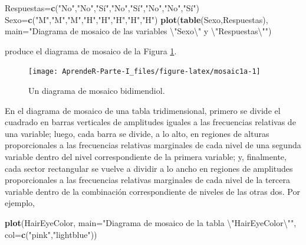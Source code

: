 \documentclass[]{book}
\newenvironment{Shaded}{\begin{snugshade}}{\end{snugshade}}
\newcommand{\CharTok}[1]{\textcolor[rgb]{0.31,0.60,0.02}{#1}}
\newcommand{\DataTypeTok}[1]{\textcolor[rgb]{0.13,0.29,0.53}{#1}}
\newcommand{\KeywordTok}[1]{\textcolor[rgb]{0.13,0.29,0.53}{\textbf{#1}}}
\newcommand{\NormalTok}[1]{#1}
\newcommand{\StringTok}[1]{\textcolor[rgb]{0.31,0.60,0.02}{#1}}
\theoremstyle{definition}
\theoremstyle{definition}
\theoremstyle{definition}
\theoremstyle{remark}
\begin{document}
\begin{Shaded}
\begin{Highlighting}[]
\NormalTok{Respuestas=}\KeywordTok{c}\NormalTok{(}\StringTok{"No"}\NormalTok{,}\StringTok{"No"}\NormalTok{,}\StringTok{"Sí"}\NormalTok{,}\StringTok{"No"}\NormalTok{,}\StringTok{"Sí"}\NormalTok{,}\StringTok{"No"}\NormalTok{,}\StringTok{"No"}\NormalTok{,}\StringTok{"Sí"}\NormalTok{)}
\NormalTok{Sexo=}\KeywordTok{c}\NormalTok{(}\StringTok{"M"}\NormalTok{,}\StringTok{"M"}\NormalTok{,}\StringTok{"M"}\NormalTok{,}\StringTok{"H"}\NormalTok{,}\StringTok{"H"}\NormalTok{,}\StringTok{"H"}\NormalTok{,}\StringTok{"H"}\NormalTok{,}\StringTok{"H"}\NormalTok{)}
\KeywordTok{plot}\NormalTok{(}\KeywordTok{table}\NormalTok{(Sexo,Respuestas), }\DataTypeTok{main=}\StringTok{"Diagrama de mosaico de las variables }\CharTok{\textbackslash{}"}\StringTok{Sexo}\CharTok{\textbackslash{}"}\StringTok{ y }\CharTok{\textbackslash{}"}\StringTok{Respuestas}\CharTok{\textbackslash{}"}\StringTok{"}\NormalTok{)}
\end{Highlighting}
\end{Shaded}

produce el diagrama de mosaico de la Figura \ref{fig:mosaic1a}.

\begin{figure}

{\centering \texttt{[image: AprendeR-Parte-I\_files/figure-latex/mosaic1a-1]} 

}

\caption{Un diagrama de mosaico bidimendiol.}\label{fig:mosaic1a}
\end{figure}

En el diagrama de mosaico de una tabla tridimensional, primero se divide el cuadrado en barras verticales de amplitudes iguales a las frecuencias relativas de una variable; luego, cada barra se divide, a lo alto, en regiones de alturas proporcionales a las frecuencias relativas marginales de cada nivel de una segunda variable dentro del nivel correspondiente de la primera variable; y, finalmente, cada sector rectangular se vuelve a dividir a lo ancho en regiones de amplitudes proporcionales a las frecuencias relativas marginales de cada nivel de la tercera variable dentro de la combinación correspondiente de niveles de las otras dos. Por ejemplo,

\begin{Shaded}
\begin{Highlighting}[]
\KeywordTok{plot}\NormalTok{(HairEyeColor,  }\DataTypeTok{main=}\StringTok{"Diagrama de mosaico de la tabla }\CharTok{\textbackslash{}"}\StringTok{HairEyeColor}\CharTok{\textbackslash{}"}\StringTok{"}\NormalTok{, }
     \DataTypeTok{col=}\KeywordTok{c}\NormalTok{(}\StringTok{"pink"}\NormalTok{,}\StringTok{"lightblue"}\NormalTok{))}
\end{Highlighting}
\end{Shaded}
\end{document}

